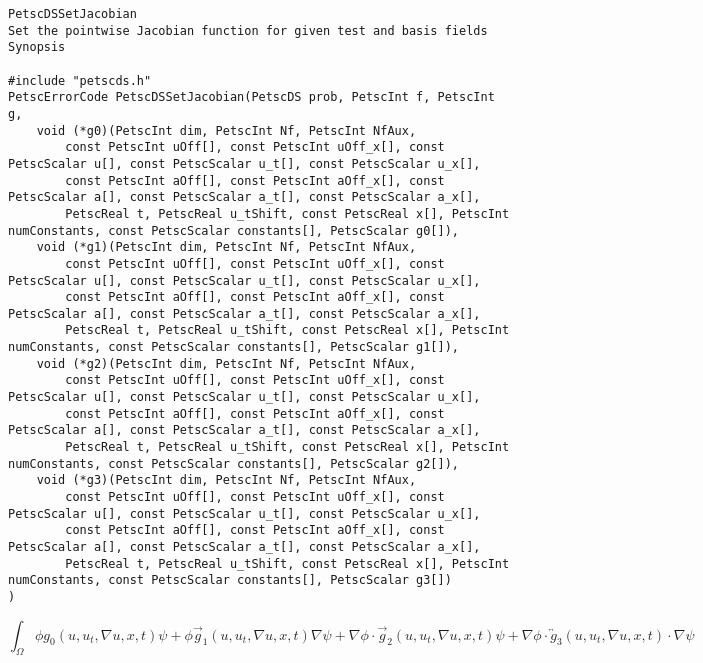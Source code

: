 \begin{lstlisting}
PetscDSSetJacobian
Set the pointwise Jacobian function for given test and basis fields
Synopsis

#include "petscds.h" 
PetscErrorCode PetscDSSetJacobian(PetscDS prob, PetscInt f, PetscInt g,
    void (*g0)(PetscInt dim, PetscInt Nf, PetscInt NfAux,
        const PetscInt uOff[], const PetscInt uOff_x[], const PetscScalar u[], const PetscScalar u_t[], const PetscScalar u_x[],
        const PetscInt aOff[], const PetscInt aOff_x[], const PetscScalar a[], const PetscScalar a_t[], const PetscScalar a_x[],
        PetscReal t, PetscReal u_tShift, const PetscReal x[], PetscInt numConstants, const PetscScalar constants[], PetscScalar g0[]),
    void (*g1)(PetscInt dim, PetscInt Nf, PetscInt NfAux,
        const PetscInt uOff[], const PetscInt uOff_x[], const PetscScalar u[], const PetscScalar u_t[], const PetscScalar u_x[],
        const PetscInt aOff[], const PetscInt aOff_x[], const PetscScalar a[], const PetscScalar a_t[], const PetscScalar a_x[],
        PetscReal t, PetscReal u_tShift, const PetscReal x[], PetscInt numConstants, const PetscScalar constants[], PetscScalar g1[]),
    void (*g2)(PetscInt dim, PetscInt Nf, PetscInt NfAux,
        const PetscInt uOff[], const PetscInt uOff_x[], const PetscScalar u[], const PetscScalar u_t[], const PetscScalar u_x[],
        const PetscInt aOff[], const PetscInt aOff_x[], const PetscScalar a[], const PetscScalar a_t[], const PetscScalar a_x[],
        PetscReal t, PetscReal u_tShift, const PetscReal x[], PetscInt numConstants, const PetscScalar constants[], PetscScalar g2[]),
    void (*g3)(PetscInt dim, PetscInt Nf, PetscInt NfAux,
        const PetscInt uOff[], const PetscInt uOff_x[], const PetscScalar u[], const PetscScalar u_t[], const PetscScalar u_x[],
        const PetscInt aOff[], const PetscInt aOff_x[], const PetscScalar a[], const PetscScalar a_t[], const PetscScalar a_x[],
        PetscReal t, PetscReal u_tShift, const PetscReal x[], PetscInt numConstants, const PetscScalar constants[], PetscScalar g3[])
)
\end{lstlisting}

\[
\int_\Omega \phi g_0(u, u_t, \nabla u, x, t) \psi + \phi {\vec g}_1(u, u_t, \nabla u, x, t) \nabla \psi + \nabla\phi \cdot {\vec g}_2(u, u_t, \nabla u, x, t) \psi + \nabla\phi \cdot {\overleftrightarrow g}_3(u, u_t, \nabla u, x, t) \cdot \nabla \psi
\]
